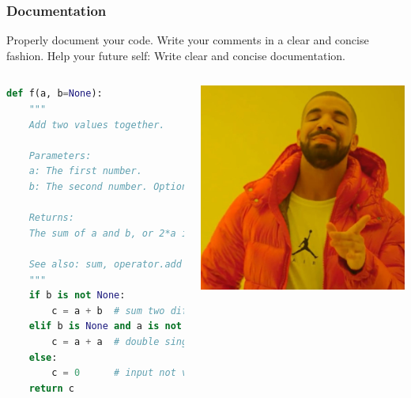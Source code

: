 \begin{frame}[fragile]
  \frametitle{Documentation}
    Properly document your code. Write your comments in a clear and concise fashion. Help your future self: Write clear and concise documentation.
    \begin{columns}
    \begin{lstlisting}[language=Python,basicstyle=\scriptsize]
def f(a, b=None):
    """
    Add two values together.
    
    Parameters:
    a: The first number.
    b: The second number. Optional.
    
    Returns:
    The sum of a and b, or 2*a if b is not given, or 0 if a is not given.
    
    See also: sum, operator.add
    """
    if b is not None:
        c = a + b  # sum two different numbers
    elif b is None and a is not None:
        c = a + a  # double single number
    else:
        c = 0      # input not valid
    return c
    \end{lstlisting}
    \includegraphics[width=\columnwidth]{figures/drakeyes.jpg}
    \end{columns}
\end{frame}



